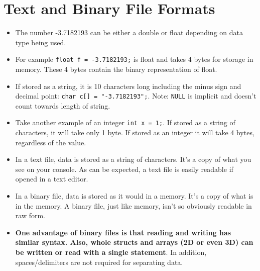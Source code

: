 \documentclass[12pt,a4paper]{article}
\begin{document}
\section{Text and Binary File Formats}
\begin{itemize}
\item The number -3.7182193 can be either a double or float depending on data type being used.
\item For example \verb|float f = -3.7182193;| is float and takes 4 bytes for storage in memory. These 4 bytes contain the binary representation of float.
\item If stored as a string, it is 10 characters long including the minus sign and decimal point: \verb|char c[] = "-3.7182193";|. Note: \verb|NULL| is implicit and doesn't count towards length of string.
\item Take another example of an integer \verb|int x = 1;|. If stored as a string of characters, it will take only 1 byte. If stored as an integer it will take 4 bytes, regardless of the value.
\item In a text file, data is stored as a string of characters. It's a copy of what you see on your console. As can be expected, a text file is easily readable if opened in a text editor.
\item In a binary file, data is stored as it would in a memory. It's a copy of what is in the memory. A binary file, just like memory, isn't so obviously readable in raw form.
\item \textbf{One advantage of binary files is that reading and writing has similar syntax. Also, whole structs and arrays (2D or even 3D) can be written or read with a single statement}. In addition, spaces/delimiters are not required for separating data.
\end{itemize}
\end{document}
